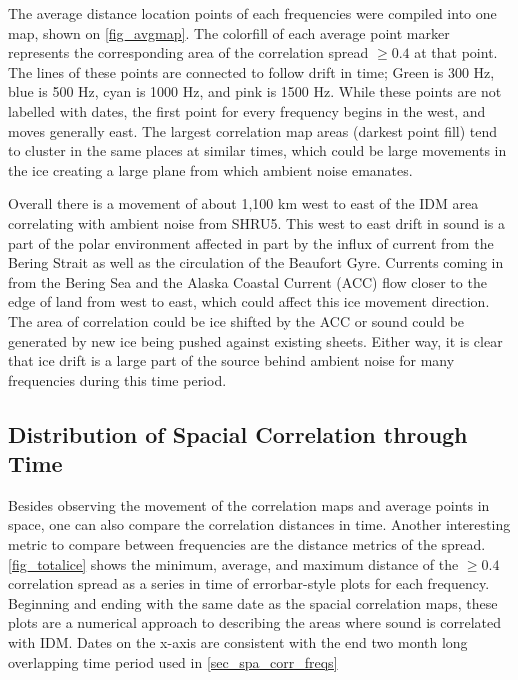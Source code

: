 The average distance location points of each frequencies were compiled into one map, shown on \autoref{fig_avgmap}. The colorfill of each average point marker represents the corresponding area of the correlation spread $\geq 0.4$ at that point. The lines of these points are connected to follow drift in time; Green is 300 Hz, blue is 500 Hz, cyan is 1000 Hz, and pink is 1500 Hz. While these points are not labelled with dates, the first point for every frequency begins in the west, and moves generally east. The largest correlation map areas (darkest point fill) tend to cluster in the same places at similar times, which could be large movements in the ice creating a large plane from which ambient noise emanates.

Overall there is a movement of about 1,100 km west to east of the IDM area correlating with ambient noise from SHRU5. This west to east drift in sound is a part of the polar environment affected in part by the influx of current from the Bering Strait as well as the circulation of the Beaufort Gyre. Currents coming in from the Bering Sea and the Alaska Coastal Current (ACC) flow closer to the edge of land from west to east, which could affect this ice movement direction. \parencite{Weingartner2005}  The area of correlation could be ice shifted by the ACC or sound could be generated by new ice being pushed against existing sheets. Either way, it is clear that ice drift is a large part of the source behind ambient noise for many frequencies during this time period. 




\subsection{Distribution of Spacial Correlation through Time}

Besides observing the movement of the correlation maps and average points in space, one can also compare the correlation distances in time. Another interesting metric to compare between frequencies are the distance metrics of the spread. \autoref{fig_totalice} shows the minimum, average, and maximum distance of the $\geq 0.4$ correlation spread as a series in time of errorbar-style plots for each frequency. Beginning and ending with the same date as the spacial correlation maps, these plots are a numerical approach to describing the areas where sound is correlated with IDM. Dates on the x-axis are consistent with the end two month long overlapping time period used in \autoref{sec_spa_corr_freqs}

